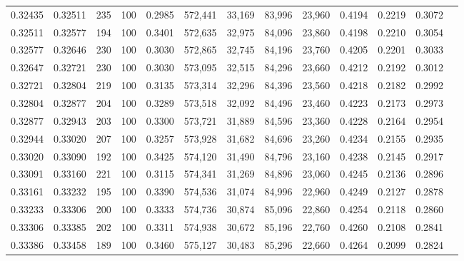 \begin{tabular}{rrrrrrrrrrrrr}
0.32435 & 0.32511 &   235 & 100 &                                     0.2985 & 572,441 &  33,169 &  83,996 &  23,960 & 0.4194 & 0.2219 & 0.3072 \\
0.32511 & 0.32577 &   194 & 100 &                                     0.3401 & 572,635 &  32,975 &  84,096 &  23,860 & 0.4198 & 0.2210 & 0.3054 \\
0.32577 & 0.32646 &   230 & 100 &                                     0.3030 & 572,865 &  32,745 &  84,196 &  23,760 & 0.4205 & 0.2201 & 0.3033 \\
0.32647 & 0.32721 &   230 & 100 &                                     0.3030 & 573,095 &  32,515 &  84,296 &  23,660 & 0.4212 & 0.2192 & 0.3012 \\
0.32721 & 0.32804 &   219 & 100 &                                     0.3135 & 573,314 &  32,296 &  84,396 &  23,560 & 0.4218 & 0.2182 & 0.2992 \\
0.32804 & 0.32877 &   204 & 100 &                                     0.3289 & 573,518 &  32,092 &  84,496 &  23,460 & 0.4223 & 0.2173 & 0.2973 \\
0.32877 & 0.32943 &   203 & 100 &                                     0.3300 & 573,721 &  31,889 &  84,596 &  23,360 & 0.4228 & 0.2164 & 0.2954 \\
0.32944 & 0.33020 &   207 & 100 &                                     0.3257 & 573,928 &  31,682 &  84,696 &  23,260 & 0.4234 & 0.2155 & 0.2935 \\
0.33020 & 0.33090 &   192 & 100 &                                     0.3425 & 574,120 &  31,490 &  84,796 &  23,160 & 0.4238 & 0.2145 & 0.2917 \\
0.33091 & 0.33160 &   221 & 100 &                                     0.3115 & 574,341 &  31,269 &  84,896 &  23,060 & 0.4245 & 0.2136 & 0.2896 \\
0.33161 & 0.33232 &   195 & 100 &                                     0.3390 & 574,536 &  31,074 &  84,996 &  22,960 & 0.4249 & 0.2127 & 0.2878 \\
0.33233 & 0.33306 &   200 & 100 &                                     0.3333 & 574,736 &  30,874 &  85,096 &  22,860 & 0.4254 & 0.2118 & 0.2860 \\
0.33306 & 0.33385 &   202 & 100 &                                     0.3311 & 574,938 &  30,672 &  85,196 &  22,760 & 0.4260 & 0.2108 & 0.2841 \\
0.33386 & 0.33458 &   189 & 100 &                                     0.3460 & 575,127 &  30,483 &  85,296 &  22,660 & 0.4264 & 0.2099 & 0.2824 \\

\end{tabular}
